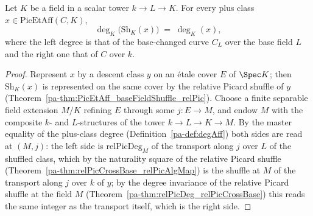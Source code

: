 \begin{theorem}
  \label{pa-thm:degAff_baseFieldShuffle}
  \leanok

  Let \(K\) be a field in a scalar tower \(k \to L \to K\).  For every plus class
  \(x \in \mathrm{PicEtAff}(C, K)\),
  \[
    \deg_K\bigl(\mathrm{Sh}_K(x)\bigr) \;=\; \deg_K(x),
  \]
  where the left degree is that of the base-changed curve \(C_L\) over the base field
  \(L\) and the right one that of \(C\) over \(k\).
\end{theorem}
\begin{proof}
  \leanok
  Represent \(x\) by a descent class \(y\) on an \'etale cover \(E\) of \(\Spec K\);
  then \(\mathrm{Sh}_K(x)\) is represented on the same cover by the relative Picard
  shuffle of \(y\) (Theorem~\ref{pa-thm:PicEtAff_baseFieldShuffle_relPic}).  Choose a
  finite separable field extension \(M/K\) refining \(E\) through some
  \(j \colon E \to M\), and endow \(M\) with the composite \(k\)- and \(L\)-structures
  of the tower \(k \to L \to K \to M\).  By the master equality of the plus-class
  degree (Definition~\ref{pa-def:degAff}) both sides are read at \((M, j)\): the left
  side is \(\mathrm{relPicDeg}_M\) of the transport along \(j\) over \(L\) of the
  shuffled class, which by the naturality square of the relative Picard shuffle
  (Theorem~\ref{pa-thm:relPicCrossBase_relPicAlgMap}) is the shuffle at \(M\) of the
  transport along \(j\) over \(k\) of \(y\); by the degree invariance of the relative
  Picard shuffle at the field \(M\)
  (Theorem~\ref{pa-thm:relPicDeg_relPicCrossBase}) this reads the same integer as the
  transport itself, which is the right side.
\end{proof}


